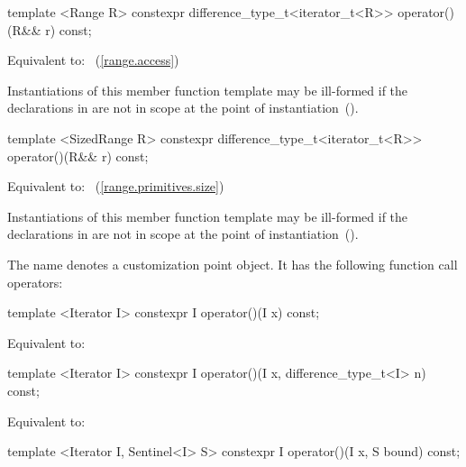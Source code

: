 \begin{itemdecl}
template <Range R>
  constexpr difference_type_t<iterator_t<R>> operator()(R&& r) const;
\end{itemdecl}

\begin{itemdescr}
\effects
Equivalent to:
~(\ref{range.access})

\remarks
Instantiations of this member function template may be ill-formed if the
declarations in  are not in scope at the
point of instantiation~().
\end{itemdescr}


\begin{itemdecl}
template <SizedRange R>
  constexpr difference_type_t<iterator_t<R>> operator()(R&& r) const;
\end{itemdecl}

\begin{itemdescr}
\pnum
\effects
Equivalent to: ~(\ref{range.primitives.size})

\pnum
\remarks
Instantiations of this member function template may be ill-formed if the
declarations in  are not in scope at the
point of instantiation~().
\end{itemdescr}

%
\pnum
The name  denotes a customization point object. It has the following function call operators:

\begin{itemdecl}
template <Iterator I>
  constexpr I operator()(I x) const;
\end{itemdecl}

\begin{itemdescr}
\pnum
\effects Equivalent to: 
\end{itemdescr}

\begin{itemdecl}
template <Iterator I>
  constexpr I operator()(I x, difference_type_t<I> n) const;
\end{itemdecl}

\begin{itemdescr}
\pnum
\effects Equivalent to: 
\end{itemdescr}

\begin{itemdecl}
template <Iterator I, Sentinel<I> S>
  constexpr I operator()(I x, S bound) const;
\end{itemdecl}

